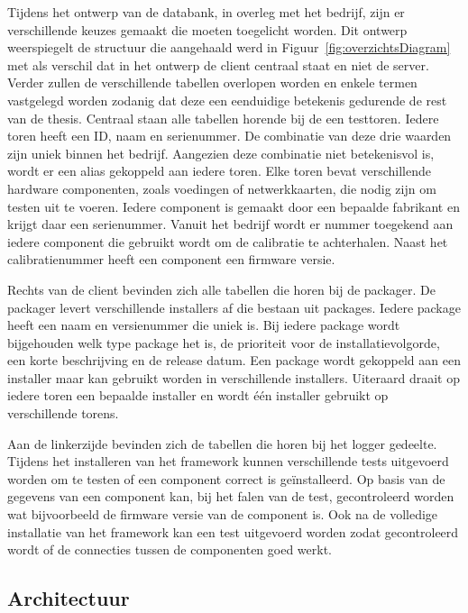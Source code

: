 Tijdens het ontwerp van de databank, in overleg met het bedrijf, zijn er verschillende keuzes gemaakt die moeten toegelicht worden.
Dit ontwerp weerspiegelt de structuur die aangehaald werd in Figuur~\vref{fig:overzichtsDiagram} met als verschil dat in het ontwerp de client centraal staat en niet de server.
Verder zullen de verschillende tabellen overlopen worden en enkele termen vastgelegd worden zodanig dat deze een eenduidige betekenis gedurende de rest van de thesis.
Centraal staan alle tabellen horende bij de een testtoren.
Iedere toren heeft een ID, naam en serienummer. 
De combinatie van deze drie waarden zijn uniek binnen het bedrijf.
Aangezien deze combinatie niet betekenisvol is, wordt er een alias gekoppeld aan iedere toren.
Elke toren bevat verschillende hardware componenten, zoals voedingen of netwerkkaarten, die nodig zijn om testen uit te voeren.
Iedere component is gemaakt door een bepaalde fabrikant en krijgt daar een serienummer.
Vanuit het bedrijf wordt er nummer toegekend aan iedere component die gebruikt wordt om de calibratie te achterhalen.
Naast het calibratienummer heeft een component een firmware versie.

Rechts van de client bevinden zich alle tabellen die horen bij de packager.
De packager levert verschillende installers af die bestaan uit packages.
Iedere package heeft een naam en versienummer die uniek is.
Bij iedere package wordt bijgehouden welk type package het is, de prioriteit voor de installatievolgorde, een korte beschrijving en de release datum.
Een package wordt gekoppeld aan een installer maar kan gebruikt worden in verschillende installers.
Uiteraard draait op iedere toren een bepaalde installer en wordt één installer gebruikt op verschillende torens.

Aan de linkerzijde bevinden zich de tabellen die horen bij het logger gedeelte.
Tijdens het installeren van het framework kunnen verschillende tests uitgevoerd worden om te testen of een component correct is geïnstalleerd.
Op basis van de gegevens van een component kan, bij het falen van de test, gecontroleerd worden wat bijvoorbeeld de firmware versie van de component is.
Ook na de volledige installatie van het framework kan een test uitgevoerd worden zodat gecontroleerd wordt of de connecties tussen de componenten goed werkt.

\subsection{Architectuur}

